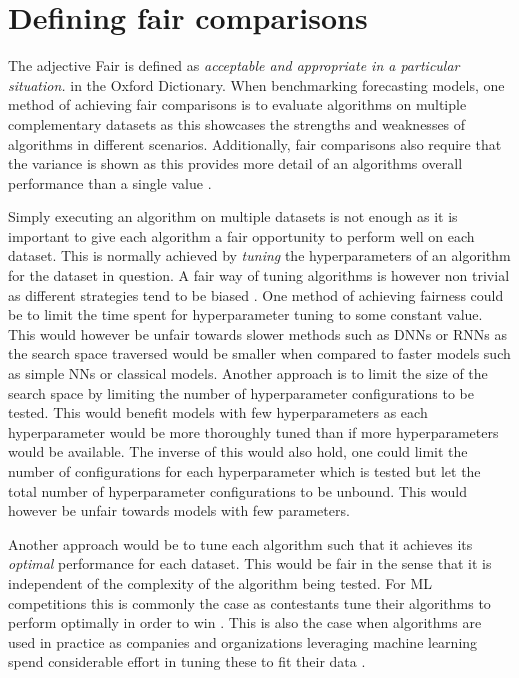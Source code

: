 \section{Defining fair comparisons}
\label{sec:fair_comparisons}
The adjective Fair is defined as \textit{acceptable and appropriate in a particular situation.} in the Oxford Dictionary. When benchmarking forecasting models, one method of achieving fair comparisons is to evaluate algorithms on multiple complementary datasets as this showcases the strengths and weaknesses of algorithms in different scenarios. Additionally, fair comparisons also require that the variance is shown as this provides more detail of an algorithms overall performance than a single value \cite{bouthillier2021accounting}.

Simply executing an algorithm on multiple datasets is not enough as it is important to give each algorithm a fair opportunity to perform well on each dataset. This is normally achieved by \textit{tuning} the hyperparameters of an algorithm for the dataset in question. A fair way of tuning algorithms is however non trivial as different strategies tend to be biased \cite{sivaprasad2020optimizer}. One method of achieving fairness could be to limit the time spent for hyperparameter tuning to some constant value. This would however be unfair towards slower methods such as DNNs or RNNs as the search space traversed would be smaller when compared to faster models such as simple NNs or classical models. Another approach is to limit the size of the search space by limiting the number of hyperparameter configurations to be tested. This would benefit models with few hyperparameters as each hyperparameter would be more thoroughly tuned than if more hyperparameters would be available. The inverse of this would also hold, one could limit the number of configurations for each hyperparameter which is tested but let the total number of hyperparameter configurations to be unbound. This would however be unfair towards models with few parameters.

Another approach would be to tune each algorithm such that it achieves its \textit{optimal} performance for each dataset. This would be fair in the sense that it is independent of the complexity of the algorithm being tested. For ML competitions this is commonly the case as contestants tune their algorithms to perform optimally in order to win \cite{roelofs2019meta}. This is also the case when algorithms are used in practice as companies and organizations leveraging machine learning spend considerable effort in tuning these to fit their data \cite{beam2020challenges}.

